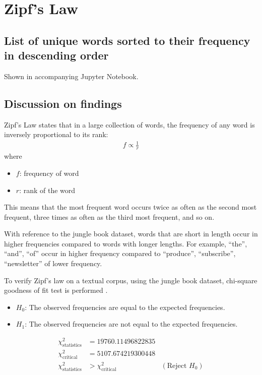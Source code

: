\section{Zipf's Law}

\subsection*{List of unique words sorted to their frequency in descending order}
Shown in accompanying Jupyter Notebook.


\subsection*{Discussion on findings}
Zipf's Law states that in a large collection of words, the frequency of any word is inversely proportional to its rank:
\begin{align}
    f \propto \frac{1}{r}
\end{align}
where  
\begin{itemize}
    \item $f$: frequency of word  
    \item $r$: rank of the word
\end{itemize}

This means that the most frequent word occurs twice as often as the second most frequent, three times as often as the third most frequent, and so on.

With reference to the jungle book dataset, words that are short in length occur in higher frequencies compared to words with longer lengths. 
For example, ``the'', ``and'', ``of'' occur in higher frequency compared to ``produce'', ``subscribe'', ``newsletter'' of lower frequency.
\newline

To verify Zipf's law on a textual corpus, using the jungle book dataset, chi-square goodness of fit test is performed \cite{web:chi_sq_test}.  
\begin{itemize}
    \item $H_0$: The observed frequencies are equal to the expected frequencies.  
    \item $H_1$: The observed frequencies are not equal to the expected frequencies. 
\end{itemize}

\begin{align*}
    \chi^2_{\text{statistics}} & = 19760.11496822835 \\
    \chi^2_{\text{critical}} & = 5107.674219300448 \\
    \chi^2_{\text{statistics}} & > \chi^2_{\text{critical}} & (\text{Reject } H_0)
\end{align*}


